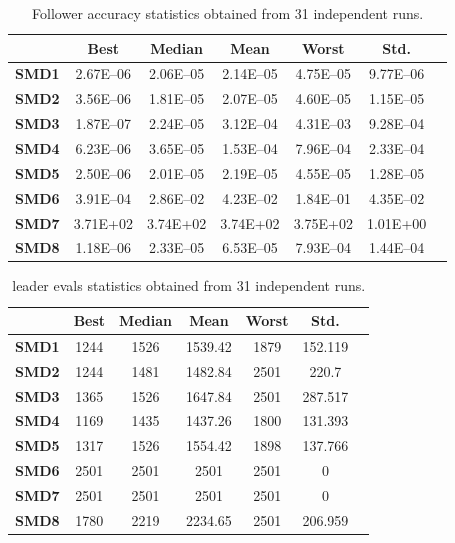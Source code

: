 \documentclass[conference]{IEEEtran}
\begin{document}
\begin{table}[!t]
\renewcommand{\arraystretch}{1.3}
    \caption{Follower accuracy statistics obtained from 31 independent runs.}
    \label{tab:follower}
    \centering
    \begin{tabular}{|c|c|c|c|c|c|c|}
\hline
&\textbf{Best}&\textbf{Median}&\textbf{Mean}&\textbf{Worst}&\textbf{Std.}\\ \hline 
\textbf{SMD1} & 2.67E--06 & 2.06E--05 & 2.14E--05 & 4.75E--05 & 9.77E--06 \\ \hline 
\textbf{SMD2} & 3.56E--06 & 1.81E--05 & 2.07E--05 & 4.60E--05 & 1.15E--05 \\ \hline 
\textbf{SMD3} & 1.87E--07 & 2.24E--05 & 3.12E--04 & 4.31E--03 & 9.28E--04 \\ \hline 
\textbf{SMD4} & 6.23E--06 & 3.65E--05 & 1.53E--04 & 7.96E--04 & 2.33E--04 \\ \hline 
\textbf{SMD5} & 2.50E--06 & 2.01E--05 & 2.19E--05 & 4.55E--05 & 1.28E--05 \\ \hline 
\textbf{SMD6} & 3.91E--04 & 2.86E--02 & 4.23E--02 & 1.84E--01 & 4.35E--02 \\ \hline 
\textbf{SMD7} &  3.71E+02 &  3.74E+02 &  3.74E+02 &  3.75E+02 &  1.01E+00 \\ \hline 
\textbf{SMD8} & 1.18E--06 & 2.33E--05 & 6.53E--05 & 7.93E--04 & 1.44E--04 \\ \hline 

    \end{tabular}
\end{table}

\begin{table}[!t]
\renewcommand{\arraystretch}{1.3}
    \caption{leader evals statistics obtained from 31 independent runs.}
    \label{tab:follower}
    \centering
    \begin{tabular}{|c|c|c|c|c|c|c|}
\hline
&\textbf{Best}&\textbf{Median}&\textbf{Mean}&\textbf{Worst}&\textbf{Std.}\\ \hline 
\textbf{SMD1} & 1244 & 1526 & 1539.42 & 1879 & 152.119 \\ \hline
\textbf{SMD2} & 1244 & 1481 & 1482.84 & 2501 & 220.7   \\ \hline
\textbf{SMD3} & 1365 & 1526 & 1647.84 & 2501 & 287.517 \\ \hline
\textbf{SMD4} & 1169 & 1435 & 1437.26 & 1800 & 131.393 \\ \hline
\textbf{SMD5} & 1317 & 1526 & 1554.42 & 1898 & 137.766 \\ \hline
\textbf{SMD6} & 2501 & 2501 & 2501 &  2501 &   0   \\ \hline
\textbf{SMD7} & 2501 & 2501 & 2501 &  2501 &   0   \\ \hline
\textbf{SMD8} & 1780 & 2219 & 2234.65 & 2501 & 206.959 \\ \hline


    \end{tabular}
\end{table}
\end{document}
